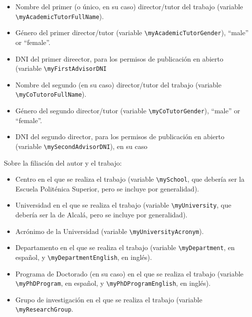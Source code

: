 {\begin{itemize}
    \item Nombre del primer (o único, en su caso) director/tutor del trabajo (variable \texttt{\textbackslash{}myAcademicTutorFullName}).
    \item Género del primer director/tutor (variable \texttt{\textbackslash{}myAcademicTutorGender}), ``male'' or ``female''.
    \item DNI del primer direector, para los permisos de publicación en abierto (variable \texttt{\textbackslash{}myFirstAdvisorDNI}


    \item Nombre del segundo (en su caso) director/tutor del trabajo (variable \texttt{\textbackslash{}myCoTutoroFullName}).
    \item Género del segundo director/tutor (variable \texttt{\textbackslash{}myCoTutorGender}), ``male'' or ``female''.
    \item DNI del segundo director, para los permisos de publicación en abierto (variable \texttt{\textbackslash{}mySecondAdvisorDNI}), en su caso

  \end{itemize}

  Sobre la filiación del autor y el trabajo:

  \begin{itemize}

    \item Centro en el que se realiza el trabajo (variable \texttt{\textbackslash{}mySchool}, que debería ser la Escuela Politénica Superior, pero se incluye por generalidad).
    \item Universidad en el que se realiza el trabajo (variable \texttt{\textbackslash{}myUniversity}, que debería ser la de Alcalá, pero se incluye por generalidad).
    \item Acrónimo de la Universidad (variable \texttt{\textbackslash{}myUniversityAcronym}).

    \item Departamento en el que se realiza el trabajo (variable \texttt{\textbackslash{}myDepartment}, en español, y \texttt{\textbackslash{}myDepartmentEnglish}, en inglés).

    \item Programa de Doctorado (en su caso) en el que se realiza el trabajo (variable \texttt{\textbackslash{}myPhDProgram}, en español, y \texttt{\textbackslash{}myPhDProgramEnglish}, en inglés).
    \item Grupo de investigación en el que se realiza el trabajo (variable \texttt{\textbackslash{}myResearchGroup}.


\end{itemize}}
